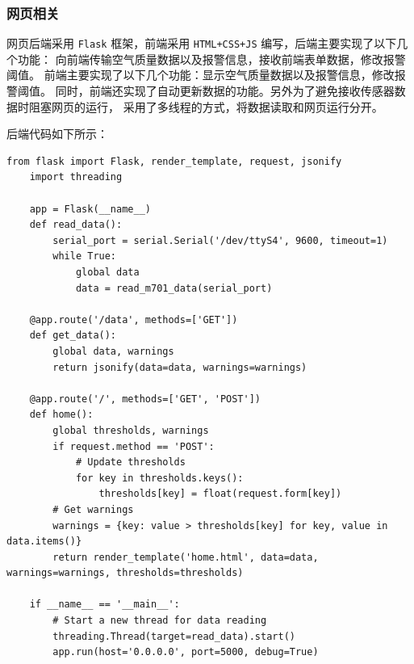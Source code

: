\documentclass[12pt,hyperref,a4paper,UTF8]{ctexart}
\begin{document}
\subsubsection{网页相关}
网页后端采用 \texttt{Flask} 框架，前端采用 \texttt{HTML+CSS+JS} 编写，后端主要实现了以下几个功能：
向前端传输空气质量数据以及报警信息，接收前端表单数据，修改报警阈值。
前端主要实现了以下几个功能：显示空气质量数据以及报警信息，修改报警阈值。
同时，前端还实现了自动更新数据的功能。另外为了避免接收传感器数据时阻塞网页的运行，
采用了多线程的方式，将数据读取和网页运行分开。

后端代码如下所示：
\newpage
\begin{lstlisting}[style=Pythonstyle, name=app.py]
    from flask import Flask, render_template, request, jsonify
    import threading

    app = Flask(__name__)
    def read_data():
        serial_port = serial.Serial('/dev/ttyS4', 9600, timeout=1)
        while True:
            global data
            data = read_m701_data(serial_port)

    @app.route('/data', methods=['GET'])
    def get_data():
        global data, warnings
        return jsonify(data=data, warnings=warnings)

    @app.route('/', methods=['GET', 'POST'])
    def home():
        global thresholds, warnings
        if request.method == 'POST':
            # Update thresholds
            for key in thresholds.keys():
                thresholds[key] = float(request.form[key])
        # Get warnings
        warnings = {key: value > thresholds[key] for key, value in data.items()}
        return render_template('home.html', data=data, warnings=warnings, thresholds=thresholds)

    if __name__ == '__main__':
        # Start a new thread for data reading
        threading.Thread(target=read_data).start()
        app.run(host='0.0.0.0', port=5000, debug=True)
\end{lstlisting}
\end{document}
